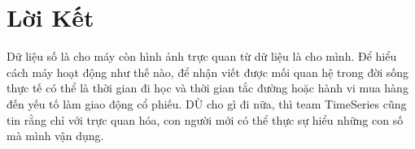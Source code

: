 \documentclass[11pt]{article}
\begin{document}
\section{Lời Kết}
Dữ liệu số là cho máy còn hình ảnh trực quan từ dữ liệu là cho mình. Để hiểu cách máy hoạt động như thế nào, để nhận viết được mối quan hệ trong đời sống thực tế có thể là thời gian đi học và thời gian tắc đường hoặc hành vi mua hàng đến yếu tố làm giao động cổ phiếu. DÙ cho gì đi nữa, thì team TimeSeries cũng tin rằng chỉ với trực quan hóa, con người mới có thể thực sự hiểu những con số mà mình vận dụng.
\end{document}

